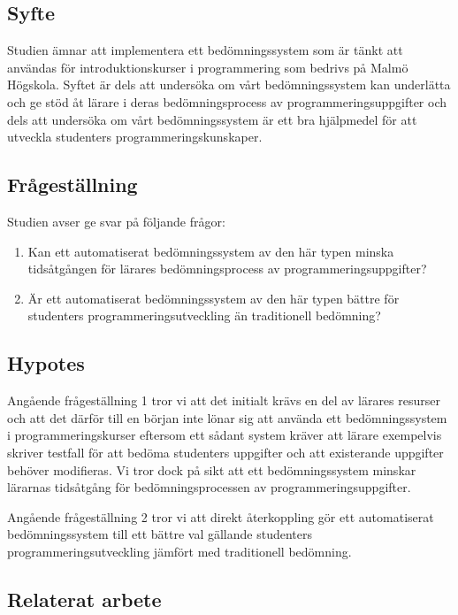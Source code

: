 \documentclass[a4paper,11pt]{article}
\begin{document}
{\subsection{Syfte}

Studien ämnar att implementera ett bedömningssystem som är tänkt att användas för introduktionskurser i programmering som bedrivs på Malmö Högskola. Syftet är dels att undersöka om vårt bedömningssystem kan underlätta och ge stöd åt lärare i deras bedömningsprocess av programmeringsuppgifter och dels att undersöka om vårt bedömningssystem är ett bra hjälpmedel för att utveckla studenters programmeringskunskaper.

\subsection{Frågeställning}

Studien avser ge svar på följande frågor:

\begin{enumerate}
\item
Kan ett automatiserat bedömningssystem av den här typen minska tidsåtgången för lärares bedömningsprocess av programmeringsuppgifter?
\item
Är ett automatiserat bedömningssystem av den här typen bättre för studenters programmeringsutveckling än traditionell bedömning?
\end{enumerate}

\newpage
\subsection{Hypotes}

Angående frågeställning 1 tror vi att det initialt krävs en del av lärares resurser och att det därför till en början inte lönar sig att använda ett bedömningssystem i programmeringskurser eftersom ett sådant system kräver att lärare exempelvis skriver testfall för att bedöma studenters uppgifter och att existerande uppgifter behöver modifieras. Vi tror dock på sikt att ett bedömningssystem minskar lärarnas tidsåtgång för bedömningsprocessen av programmeringsuppgifter.

Angående frågeställning 2 tror vi att direkt återkoppling gör ett automatiserat bedömningssystem till ett bättre val gällande studenters programmeringsutveckling jämfört med traditionell bedömning.

\subsection{Relaterat arbete}

}
\end{document}
